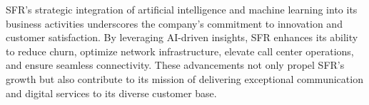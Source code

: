 SFR's strategic integration of artificial intelligence and machine learning into its business activities underscores the company's commitment to innovation and customer satisfaction. By leveraging AI-driven insights, SFR enhances its ability to reduce churn, optimize network infrastructure, elevate call center operations, and ensure seamless connectivity. These advancements not only propel SFR's growth but also contribute to its mission of delivering exceptional communication and digital services to its diverse customer base.
